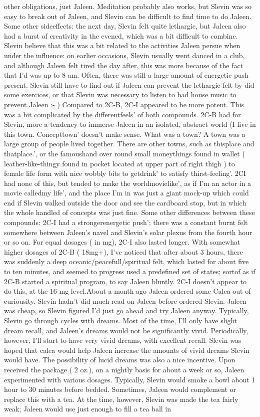 \documentclass[12pt]{book}
\begin{document}
other obligations, just Jaleen. Meditation probably also works, but Slevin was so easy to break out of Jaleen, and Slevin can be difficult to find time to do Jaleen. Some other sideeffects: the next day, Slevin felt quite lethargic, but Jaleen also had a burst of creativity in the evened, which was a bit difficult to combine. Slevin believe that this was a bit related to the activities Jaleen persue when under the influence: on earlier occasions, Slevin usually went danced in a club, and although Jaleen felt tired the day after, this was more because of the fact that I'd was up to 8 am. Often, there was still a large amount of energetic push present. Slevin still have to find out if Jaleen can prevent the lethargic felt by did some exercices, or that Slevin was necessary to listen to bad house music to prevent Jaleen :- ) Compared to 2C-B, 2C-I appeared to be more potent. This was a bit complicated by the differentfeels' of both compounds. 2C-B had for Slevin, more a tendency to immerse Jaleen in an isolated, abstract world (I live in this town. Concepttown' doesn't make sense. What was a town? A town was a large group of people lived together. There are other towns, such as thisplace and thatplace.', or the famoushand over round small moneythings found in wallet ( leather-like-thingy found in pocket located at upper part of right thigh ) to female life form with nice wobbly bits to getdrink' to satisfy thirst-feeling'. 2CI had none of this, but tended to make the worldmovielike', as if I'm an actor in a movie calledmy life', and the place I'm in was just a giant mock-up which could end if Slevin walked outside the door and see the cardboard stop, but in which the whole handled of concepts was just fine. Some other differences between these compounds: 2C-I had a strongerenergetic push'; there was a constant burnt felt somewhere between Jaleen's navel and Slevin's solar plexus from the fourth hour or so on. For equal dosages ( in mg), 2C-I also lasted longer. With somewhat higher dosages of 2C-B ( 18mg+), I've noticed that after about 3 hours, there was suddenly a deep oceanic/peacefull/spiritual felt, which lasted for about five to ten minutes, and seemed to progress used a predefined set of states; sortof as if 2C-B started a spiritual program, to say Jaleen bluntly. 2C-I doesn't appear to do this, at the 16 mg level.About a month ago Jaleen ordered some Calea out of curiousity. Slevin hadn't did much read on Jaleen before ordered Slevin. Jaleen was cheap, so Slevin figured I'd just go ahead and try Jaleen anyway. Typically, Slevin go through cycles with dreams. Most of the time, I'll only have slight dream recall, and Jaleen's dreams would not be significantly vivid. Periodically, however, I'll start to have very vivid dreams, with excellent recall. Slevin was hoped that calea would help Jaleen increase the amounts of vivid dreams Slevin would have. The possibility of lucid dreams was also a nice incentive. Upon received the package ( 2 oz.), on a nightly basis for about a week or so, Jaleen experimented with various dosages. Typically, Slevin would smoke a bowl about 1 hour to 30 minutes before bedded. Sometimes, Jaleen would complement or replace this with a tea. At the time, however, Slevin was made the tea fairly weak; Jaleen would use just enough to fill a tea ball in 
\end{document}
